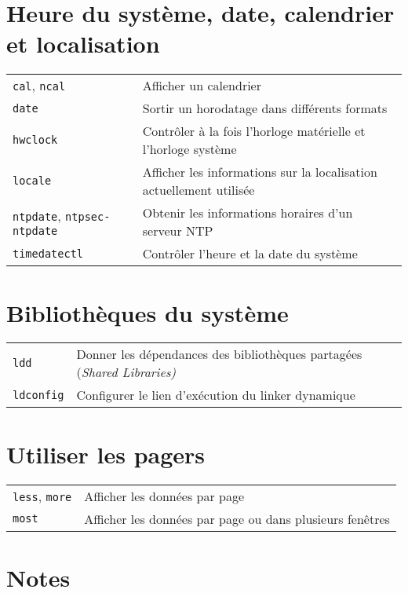 \documentclass[10pt,a4paper]{article}
\begin{document}
\begin{multicols}{2}
\section{Heure du système, date, calendrier et localisation}
\begin{tabular}{ p{2.75cm} p{8.25cm} }
  \hline
  \texttt{cal}, \texttt{ncal} & Afficher un calendrier\\
  \rowcolor{Gray}
  \texttt{date} & Sortir un horodatage dans différents formats \\
  \texttt{hwclock} & Contrôler à la fois l'horloge matérielle et l'horloge système\\
  \rowcolor{Gray}
  \texttt{locale} & Afficher les informations sur la localisation actuellement utilisée \\
  \texttt{ntpdate}, \texttt{ntpsec-ntpdate} & Obtenir les informations horaires d'un serveur NTP \\
  \rowcolor{Gray}
  \texttt{timedatectl} & Contrôler l'heure et la date du système \\
  \hline
\end{tabular}

\columnbreak

\section{Bibliothèques du système}

\begin{tabular}{ p{2.5cm} p{8.5cm} }
  \hline 
  \texttt{ldd} & Donner les dépendances des bibliothèques partagées (\textit{Shared Libraries)} \\
  \rowcolor{Gray}
  \texttt{ldconfig} & Configurer le lien d'exécution du linker dynamique \\
  \hline
\end{tabular}

\section{Utiliser les pagers}
\begin{tabular}{ p{2.5cm} p{8.5cm} }
  \hline
  \texttt{less}, \texttt{more} & Afficher les données par page \\
  \rowcolor{Gray}
  \texttt{most} & Afficher les données par page ou dans plusieurs fenêtres \\
  \hline
\end{tabular}
\section*{Notes}


\end{multicols}
\end{document}
